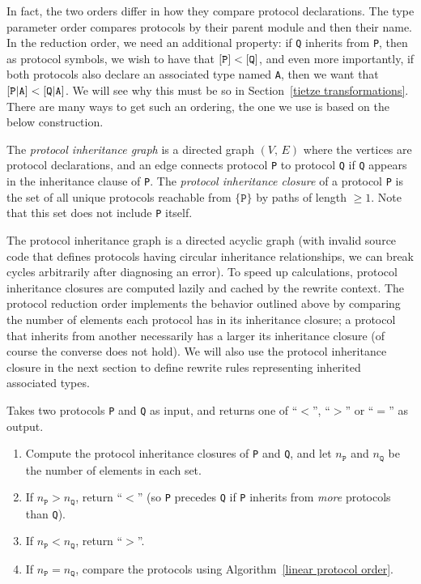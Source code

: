 \documentclass[../generics]{subfiles}
\begin{document}
In fact, the two orders differ in how they compare protocol declarations. The type parameter order compares protocols by their parent module and then their name. In the reduction order, we need an additional property: if \texttt{Q} inherits from \texttt{P}, then as protocol symbols, we wish to have that $[\texttt{P}]<[\texttt{Q}]$, and even more importantly, if both protocols also declare an associated type named \texttt{A}, then we want that $[\texttt{P}|\texttt{A}]<[\texttt{Q}|\texttt{A}]$. We will see why this must be so in Section~\ref{tietze transformations}. There are many ways to get such an ordering, the one we use is based on the below construction.

\begin{definition}
%
%
%
%
%
%
%
The \emph{protocol inheritance graph} is a directed graph $(V,\,E)$ where the vertices are protocol declarations, and an edge connects protocol \texttt{P} to protocol \texttt{Q} if \texttt{Q} appears in the inheritance clause of \texttt{P}. The \emph{protocol inheritance closure} of a protocol \texttt{P} is the set of all unique protocols reachable from $\{\texttt{P}\}$ by paths of length $\ge 1$. Note that this set does not include \texttt{P} itself.
\end{definition}
%
The protocol inheritance graph is a directed acyclic graph (with invalid source code that defines protocols having circular inheritance relationships, we can break cycles arbitrarily after diagnosing an error). To speed up calculations, protocol inheritance closures are computed lazily and cached by the rewrite context. The protocol reduction order implements the behavior outlined above by comparing the number of elements each protocol has in its inheritance closure; a protocol that inherits from another necessarily has a larger its inheritance closure (of course the converse does not hold). We will also use the protocol inheritance closure in the next section to define rewrite rules representing inherited associated types.
%
\begin{algorithm}\label{protocol reduction order} Takes two protocols \texttt{P} and \texttt{Q} as input, and returns one of ``$<$'', ``$>$'' or ``$=$'' as output.
\begin{enumerate}
\item Compute the protocol inheritance closures of \texttt{P} and \texttt{Q}, and let $n_\texttt{P}$ and $n_\texttt{Q}$ be the number of elements in each set.
\item If $n_\texttt{P}>n_\texttt{Q}$, return ``$<$'' (so \texttt{P} precedes \texttt{Q} if \texttt{P} inherits from \emph{more} protocols than \texttt{Q}).
\item If $n_\texttt{P}<n_\texttt{Q}$, return ``$>$''.
\item If $n_\texttt{P}=n_\texttt{Q}$, compare the protocols using Algorithm~\ref{linear protocol order}.
\end{enumerate}
\end{algorithm}
\end{document}
